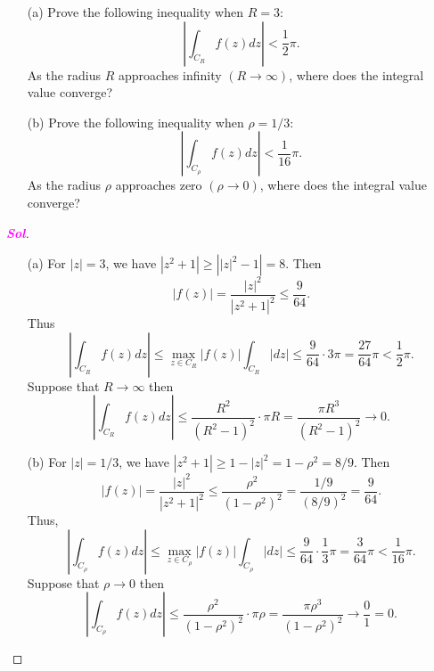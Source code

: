 \documentclass{article}
\theoremstyle{definition}
\newcommand{\of}[1]{\left( #1 \right)}
\newcommand{\abs}[1]{\left\lvert #1 \right\rvert}
\newcommand{\sol}{\textcolor{magenta}{\bf Sol}}
\begin{document}
\begin{enumerate}
\begin{center}
		\end{center}
		\vspace{4pt}
		\begin{enumerate}
			\item[(a)] Prove the following inequality when $R=3$: \[
			\abs{\int_{C_R}f\of{z}dz}<\frac{1}{2}\pi.
			\] As the radius $R$ approaches infinity $\of{R\to\infty}$, where does the integral value converge?
			\item[(b)] Prove the following inequality when $\rho = 1/3$:
			\[
			\abs{\int_{C_\rho}f\of{z}dz}<\frac{1}{16}\pi.
			\] As the radius $\rho$ approaches zero $\of{\rho\to 0}$, where does the integral value converge?
		\end{enumerate}
		\begin{proof}[\sol]
			\begin{enumerate}
				\item[(a)] For $\abs{z}=3$, we have $\abs{z^2+1}\geq\abs{\abs{z}^2-1}=8$. Then \[
				\abs{f\of{z}}=\frac{\abs{z}^2}{\abs{z^2+1}^2}\leq\frac{9}{64}.
				\] Thus \[
				\abs{\int_{C_R}f\of{z}dz}\leq\max_{z\in C_R}\abs{f\of{z}}\int_{C_R}\abs{dz}\leq\frac{9}{64}\cdot3\pi=\frac{27}{64}\pi<\frac{1}{2}\pi.
				\] Suppose that $R\to\infty$ then \[
				\abs{\int_{C_R}f\of{z}dz}\leq\frac{R^2}{\of{R^2-1}^2}\cdot\pi R=\frac{\pi R^3}{\of{R^2-1}^2}\to 0.
				\]
				\vspace{4pt}
				\item[(b)] For $\abs{z}=1/3$, we have $\abs{z^2+1}\geq 1-\abs{z}^2=1-\rho^2=8/9$. Then \[
				\abs{f\of{z}}=\frac{\abs{z}^2}{\abs{z^2+1}^2}\leq\frac{\rho^2}{(1-\rho^2)^2}=\frac{1/9}{\of{8/9}^2}=\frac{9}{64}.
				\] Thus, \[
				\abs{\int_{C_\rho}f\of{z}dz}\leq\max_{z\in C_\rho}\abs{f\of{z}}\int_{C_\rho}\abs{dz}\leq\frac{9}{64}\cdot\frac{1}{3}\pi=\frac{3}{64}\pi<\frac{1}{16}\pi.
				\] Suppose that $\rho\to 0$ then \[
				\abs{\int_{C_\rho}f\of{z}dz}\leq\frac{\rho^2}{\of{1-\rho^2}^2}\cdot\pi \rho=\frac{\pi \rho^3}{\of{1-\rho^2}^2}\to \frac{0}{1}=0.
				\]
			\end{enumerate}
		\end{proof}
		

\end{enumerate}
\end{document}
